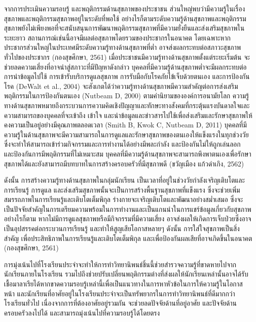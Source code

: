 \begin{titlepage}
\begin{enumerate}
          จากการประเมินความรอบรู้ และพฤติกรรมด้านสุขภาพของประชาชน ส่วนใหญ่พบว่ามีความรู้ในเรื่องสุขภาพและพฤติกรรมสุขภาพอยู่ในระดับที่พอใช้ อย่างไรก็ตามระดับความรู้ด้านสุขภาพและพฤติกรรมสุขภาพยังไม่เพียงพอที่จะสนับสนุนการพัฒนาพฤติกรรมสุขภาพที่มีความยั่งยืนและส่งเสริมสุขภาพในระยะยาว สถานการณ์เช่นนี้อาจมีผลต่อสุขภาพโดยรวมของประชากรในอนาคต โดยเฉพาะหากประชากรส่วนใหญ่ในประเทศมีระดับความรู้ทางด้านสุขภาพที่ต่ำ อาจส่งผลกระทบต่อสภาวะสุขภาพทั่วไปของประชากร (กองสุขศึกษา, 2561) เมื่อประชาชนมีความรู้ทางด้านสุขภาพตั้งแต่ระยะเริ่มต้น จะช่วยลดความเสี่ยงที่อาจนำสู่สภาวะที่มีปัญหาดังกล่าว บุคคลที่มีความรู้ด้านสุขภาพต่ำจะมีผลกระทบต่อการนำข้อมูลไปใช้ การเข้ารับบริการดูแลสุขภาพ การรับมือกับโรคภัยไข้เจ็บด้วยตนเอง และการป้องกันโรค (DeWalt et al., 2004) จะสังเกตได้ว่าความรู้ทางด้านสุขภาพมีความสำคัญต่อการส่งเสริมพฤติกรรมในการป้องกันตนเอง (Nutbeam D, 2000) ตามคำนิยามขององค์การอนามัยโลก ความรู้ทางด้านสุขภาพหมายถึงกระบวนการความคิดเชิงปัญญาและทักษะทางสังคมที่กระตุ้นแรงบันดาลใจและความสามารถของบุคคลที่จะเข้าถึง เข้าใจ และนำข้อมูลและข่าวสารไปใช้เพื่อส่งเสริมและรักษาสุขภาพให้คงความเป็นอยู่อย่างมีคุณภาพตลอดเวลา (Smith B, Kwok C, Nutbeam D, 2011) บุคคลที่มีความรู้ในด้านสุขภาพจะมีความสามารถในการดูแลและรักษาสุขภาพของตนเองให้แข็งแรงในทุกช่วงวัย ซึ่งจะทำให้สามารถเข้าร่วมกิจกรรมและการทำงานได้อย่างมีพละกำลัง และป้องกันไม่ให้ถูกเล่นลอก และป้องกันการมีพฤติกรรมที่ไม่เหมาะสม บุคคลที่มีความรู้ด้านสุขภาพจะสามารถพึงพาตนเองเพื่อรักษาสุขภาพได้และยังสามารถมีบทบาทในการสร้างครอบครัวที่มีสุขภาพดี (ขวัญเมือง แก้วดำเกิง, 2562)

          ดังนั้น การสร้างความรู้ทางด้านสุขภาพในกลุ่มนักเรียน เป็นเวลาที่อยู่ในช่วงวัยกำลังเจริญเติบโตและการเรียนรู้ การดูแล และส่งเสริมสุขภาพนั้นจะเป็นการสร้างพื้นฐานสุขภาพที่แข็งแรง ซึ่งจะช่วยเพิ่มสมรรถภาพในการเรียนรู้และเติบโตเต็มพิกุล ร่างกายจะเจริญเติบโตและพัฒนาอย่างสม่ำเสมอ ซึ่งจะเป็นปัจจัยสำคัญในการเตรียมความพร้อมในการทำงานและเป็นแกนนำในการแชร์ข้อมูลเกี่ยวกับสุขภาพ อย่างไรก็ตาม หากไม่มีการดูแลสุขภาพหรือมีกิจกรรมที่มีความเสี่ยง อาจส่งผลให้เกิดการเจ็บป่วยซึ่งอาจเป็นอุปสรรคต่อกระบวนการเรียนรู้ และทำให้สูญเสียโอกาสหลายๆ ดังนั้น การใส่ใจสุขภาพเป็นสิ่งสำคัญ เพื่อประสิทธิภาพในการเรียนรู้และเติบโตเต็มพิกุล และเพื่อป้องกันผลเสียที่อาจเกิดขึ้นในอนาคต (กองสุขศึกษา, 2561)

          การมุ่งเน้นไปที่โรงเรียนประจำจะทำให้การทำวิทยานิพนธ์ชิ้นนี้ช่วยสำรวจความรู้ที่ขาดหายไปจากนักเรียนภายในโรงเรียน รวมไปถึงช่วยปรับเปลี่ยนพฤติกรรมต่างที่ส่งผลให้นักเรียนเหล่านั้นอาจได้รับเชื้อมาลาเรียได้หากขาดความรอบรู้เหล่านี้เพื่อเป็นแนวทางในการหาหัวข้อในการให้ความรู้ในโอกาสหน้า และนักเรียนที่อาศัยอยู่ในโรงเรียนประจำจะเป็นทรัพยากรในการทำวิทยานิพนธ์ที่ดีมากกว่าโรงเรียนทั่วไป เนื่องจากการที่ต้องอาศัยอยู่รวมกัน จะช่วยลดปัจจัยด้านที่อยู่อาศัย และปัจจัยด้านครอบครัวลงไปได้ และสามารถมุ่งเน้นไปที่ความรอบรู้ได้โดยตรง


\end{enumerate}
\end{titlepage}
